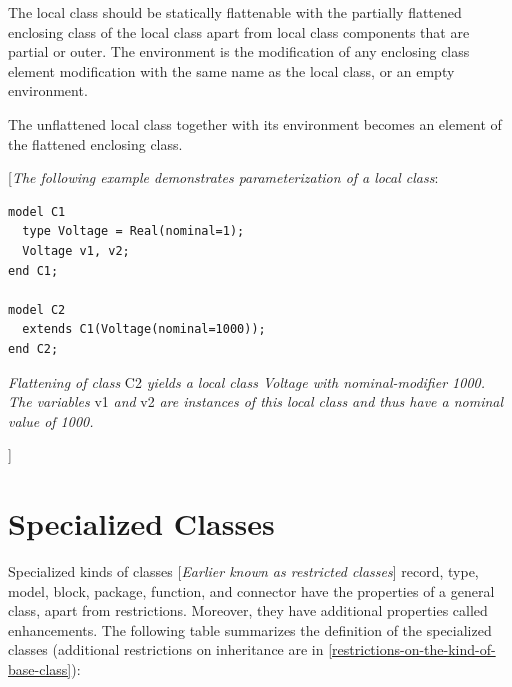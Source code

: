 \documentclass[10pt,a4paper]{report}
\def\doublelabel#1{\label{#1}}
\begin{document}
The local class should be statically flattenable with the partially
flattened enclosing class of the local class apart from local class
components that are partial or outer. The environment is the
modification of any enclosing class element modification with the same
name as the local class, or an empty environment.

The unflattened local class together with its environment becomes an
element of the flattened enclosing class.

{[}\emph{The following example demonstrates parameterization of a local
class}:
\begin{lstlisting}[language=modelica]
model C1
  type Voltage = Real(nominal=1);
  Voltage v1, v2;
end C1;

model C2
  extends C1(Voltage(nominal=1000));
end C2;
\end{lstlisting}

\emph{Flattening of class} C2 \emph{yields a local class Voltage with
nominal-modifier 1000. The variables} v1 \emph{and} v2 \emph{are
instances of this local class and thus have a nominal value of 1000.}

{]}

\section{Specialized Classes}\doublelabel{specialized-classes}

Specialized kinds of classes {[}\emph{Earlier known as restricted
classes}{]} record, type, model, block, package, function, and connector
have the properties of a general class, apart from restrictions.
Moreover, they have additional properties called enhancements. The
following table summarizes the definition of the specialized classes
(additional restrictions on inheritance are in \ref{restrictions-on-the-kind-of-base-class}):
\end{document}
